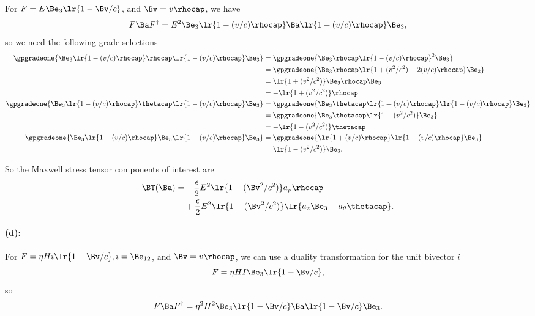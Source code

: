 For \( F = E \Be_3 \lr{ 1 - \Bv/c } \), and \( \Bv = v \rhocap \), we have
\begin{dmath}\label{eqn:poyntingStaticExamples:1220}
F \Ba F^\dagger
=
E^2 \Be_3 \lr{ 1 - (v/c) \rhocap } \Ba \lr{ 1 - (v/c) \rhocap } \Be_3,
\end{dmath}
so we need the following grade selections
\begin{equation}\label{eqn:poyntingStaticExamples:1260}
\begin{aligned}
\gpgradeone{ \Be_3 \lr{ 1 - (v/c) \rhocap } \rhocap \lr{ 1 - (v/c) \rhocap } \Be_3 }
&=
\gpgradeone{ \Be_3 \rhocap \lr{ 1 - (v/c) \rhocap }^2 \Be_3 } \\
&=
\gpgradeone{ \Be_3 \rhocap \lr{ 1 + (v^2/c^2) - 2 (v/c) \rhocap } \Be_3 } \\
&=
\lr{ 1 + (v^2/c^2) } \Be_3 \rhocap \Be_3 \\
&=
-\lr{ 1 + (v^2/c^2) } \rhocap \\
\gpgradeone{ \Be_3 \lr{ 1 - (v/c) \rhocap } \thetacap \lr{ 1 - (v/c) \rhocap } \Be_3 }
&=
\gpgradeone{ \Be_3 \thetacap \lr{ 1 + (v/c) \rhocap } \lr{ 1 - (v/c) \rhocap } \Be_3 } \\
&=
\gpgradeone{ \Be_3 \thetacap \lr{ 1 - (v^2/c^2) } \Be_3 } \\
&=
-\lr{ 1 - (v^2/c^2) } \thetacap \\
\gpgradeone{ \Be_3 \lr{ 1 - (v/c) \rhocap } \Be_3 \lr{ 1 - (v/c) \rhocap } \Be_3 }
&=
\gpgradeone{ \lr{ 1 + (v/c) \rhocap } \lr{ 1 - (v/c) \rhocap } \Be_3 } \\
&=
\lr{ 1 - (v^2/c^2) } \Be_3.
\end{aligned}
\end{equation}

So the Maxwell stress tensor components of interest are
\begin{equation}\label{eqn:poyntingStaticExamples:1320}
\begin{aligned}
\BT(\Ba)
&=
-\frac{\epsilon}{2} E^2 \lr{ 1 + (\Bv^2/c^2) } a_\rho \rhocap \\
&\quad +
\frac{\epsilon}{2} E^2 \lr{ 1 - (\Bv^2/c^2) } \lr{ a_z \Be_3 - a_\theta \thetacap }.
\end{aligned}
\end{equation}

\paragraph{(d):}

For \( F = \eta H i \lr{ 1 - \Bv/c }, i = \Be_{12} \), and \( \Bv = v \rhocap \), we can use a duality transformation for the unit bivector \( i \)
\begin{equation}\label{eqn:poyntingStaticExamples:1340}
F = \eta H I \Be_3 \lr{ 1 - \Bv/c },
\end{equation}
so
\begin{equation}\label{eqn:poyntingStaticExamples:1360}
F \Ba F^\dagger = \eta^2 H^2 \Be_3 \lr{ 1 - \Bv/c } \Ba \lr{ 1 - \Bv/c } \Be_3.
\end{equation}


